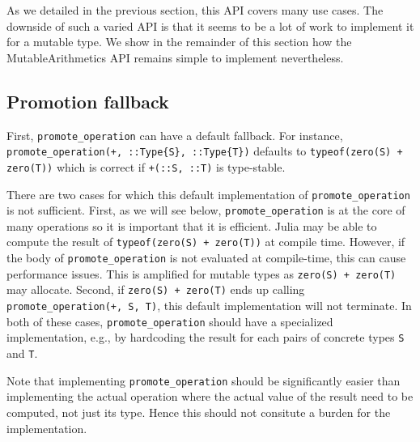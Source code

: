 \documentclass{juliacon}
\newcommand{\ma}{MutableArithmetics}
\begin{document}
As we detailed in the previous section, this API covers many use cases.
The downside of such a varied API is that it seems to be a lot of work to implement it for a mutable type.
We show in the remainder of this section how the \ma{} API remains simple to implement nevertheless.

\subsection{Promotion fallback}
First, \lstinline|promote_operation| can have a default fallback.
For instance, \lstinline|promote_operation(+, ::Type{S}, ::Type{T})|
defaults to \lstinline|typeof(zero(S) + zero(T))| which is correct if \lstinline|+(::S, ::T)| is type-stable.

There are two cases for which this default implementation of \lstinline|promote_operation| is not sufficient.
First, as we will see below, \lstinline|promote_operation| is at the core of many operations so it is important that it is efficient.
Julia may be able to compute the result of \lstinline|typeof(zero(S) + zero(T))| at compile time.
However, if the body of \lstinline|promote_operation| is not evaluated at compile-time, this can cause performance issues.
This is amplified for mutable types as \lstinline|zero(S) + zero(T)| may allocate.
Second, if \lstinline|zero(S) + zero(T)| ends up calling \lstinline|promote_operation(+, S, T)|, this default implementation will not terminate.
In both of these cases, \lstinline|promote_operation| should have a specialized implementation, e.g., by hardcoding the result for each pairs of concrete types \lstinline|S| and \lstinline|T|.

Note that implementing \lstinline|promote_operation| should be significantly easier than implementing the actual operation where the actual value of the result need to be computed, not just its type. Hence this should not consitute a burden for the implementation.
\end{document}
